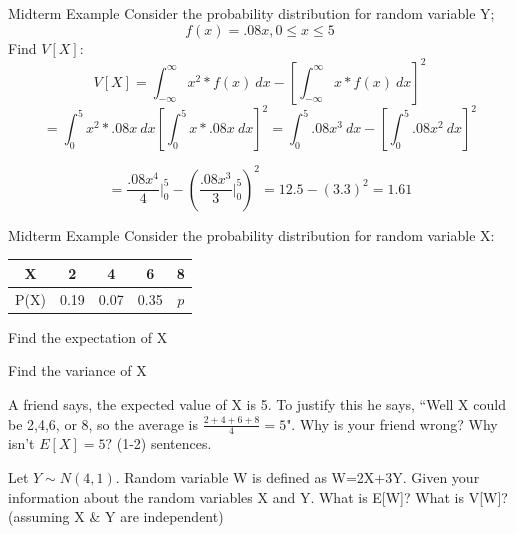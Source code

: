 \documentclass{beamer}
\begin{document}
\begin{frame}{Midterm Example}
	Consider the probability distribution for random variable Y;
	\[
		f(x)=.08x, 0\leq x \leq 5
	\]
	Find $V[X]$:
	\[
		V[X]=\int_{-\infty}^\infty x^2 * f(x) \ dx - \left[ \int_{-\infty}^\infty x * f(x) \ dx \right]^2
	\]
	\[
		= \int_0^5 x^2 * .08x \ dx \left[\int_0^5 x * .08x \ dx \right]^2= \int_0^5 .08x^3 \ dx - \left[  \int_0^5 .08x^2 \ dx \right]^2
	\]

	\[
		=\frac{.08x^4}{4} \Big|_0^5 - \left( \frac{.08x^3}{3}  \Big|_0^5\right) ^2= 12.5-(3.3)^2=1.61 
	\]
\end{frame}


%
%

\begin{frame}{Midterm Example}
	Consider the probability distribution for random variable X:
	
	\begin{center}
		\begin{tabular}{|c|c|c|c|c|}
			\hline
			X    & 2    & 4    & 6    & 8   \\ \hline
			P(X) & 0.19 & 0.07 & 0.35 & $p$ \\
			\hline
		\end{tabular}
	\end{center}
	\begin{enumerate}[label=(\alph*)]
		\footnotesize{\item Find the expectation of X
			\item  Find the variance of X
			\item A friend says, the expected value of X is 5. To justify this he says, ``Well X could be 2,4,6, or 8, so the average is $\frac{2+4+6+8}{4} = 5$". Why is your friend wrong? Why isn't $E[X]=5?$ (1-2) sentences. 
			\item Let $Y\sim N(4,1)$. Random variable W is defined as W=2X+3Y. Given your information about the random variables X and Y. What is E[W]? What is V[W]? (assuming X \& Y are independent) }
	\end{enumerate}
\end{frame}
\end{document}
